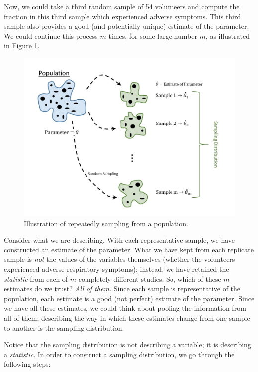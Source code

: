 \documentclass[
]{book}
\theoremstyle{plain}
\theoremstyle{mydefn}
\theoremstyle{myexmpl}
\theoremstyle{remark}
\begin{document}
Now, we could take a third random sample of 54 volunteers and compute the fraction in this third sample which experienced adverse symptoms. This third sample also provides a good (and potentially unique) estimate of the parameter. We could continue this process \(m\) times, for some large number \(m\), as illustrated in Figure \ref{fig:samplingdistns-sampling-distribution}.

\begin{figure}

{\centering \includegraphics[width=0.8\linewidth]{./images/SamplingDistns-Sampling-Distribution} 

}

\caption{Illustration of repeatedly sampling from a population.}\label{fig:samplingdistns-sampling-distribution}
\end{figure}

Consider what we are describing. With each representative sample, we have constructed an estimate of the parameter. What we have kept from each replicate sample is \emph{not} the values of the variables themselves (whether the volunteers experienced adverse respiratory symptoms); instead, we have retained the \emph{statistic} from each of \(m\) completely different studies. So, which of these \(m\) estimates do we trust? \emph{All of them.} Since each sample is representative of the population, each estimate is a good (not perfect) estimate of the parameter. Since we have all these estimates, we could think about pooling the information from all of them; describing the way in which these estimates change from one sample to another is the sampling distribution.

Notice that the sampling distribution is not describing a variable; it is describing a \emph{statistic}. In order to construct a sampling distribution, we go through the following steps:
\end{document}
